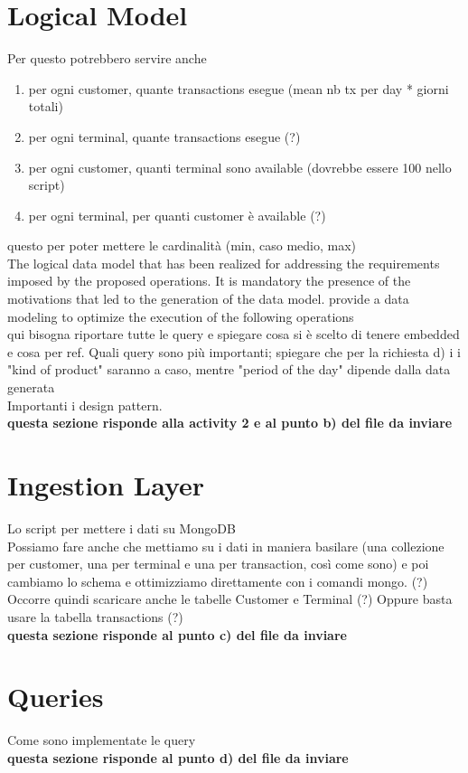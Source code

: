 \documentclass[letterpaper,11pt]{article}
\begin{document}
\section{Logical Model}
Per questo potrebbero servire anche
\begin{enumerate}
    \item per ogni customer, quante transactions esegue (mean nb tx per day * giorni totali)
    \item per ogni terminal, quante transactions esegue  (?)
    \item per ogni customer, quanti terminal sono available (dovrebbe essere 100 nello script)
    \item per ogni terminal, per quanti customer è available (?)
\end{enumerate}
questo per poter mettere le cardinalità (min, caso medio, max)
\\
The logical data model that has been realized for addressing the requirements imposed by the proposed operations. It is mandatory the presence of the motivations that led to the generation of the data model.
provide a data modeling to optimize the execution of the following operations
\\
qui bisogna riportare tutte le query e spiegare cosa si è scelto di tenere embedded e cosa per ref. Quali query sono più importanti; spiegare che per la richiesta d) i i "kind of product" saranno a caso, mentre "period of the day" dipende dalla data generata
\\
Importanti i design pattern.
\\
\textbf{questa sezione risponde alla activity 2 e al punto b) del file da inviare}

\section{Ingestion Layer}
Lo script per mettere i dati su MongoDB\\
Possiamo fare anche che mettiamo su i dati in maniera basilare (una collezione per customer, una per terminal e una per transaction, così come sono) e poi cambiamo lo schema e ottimizziamo direttamente con i comandi mongo. (?)
\\
Occorre quindi scaricare anche le tabelle Customer e Terminal (?) Oppure basta usare la tabella transactions (?)
\\
\textbf{questa sezione risponde al punto c) del file da inviare}

\section{Queries}
Come sono implementate le query\\
\textbf{questa sezione risponde al punto d) del file da inviare}
\end{document}
